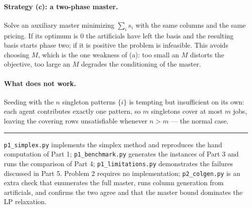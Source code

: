 \documentclass[11pt]{article}
\theoremstyle{definition}
\theoremstyle{plain}
\begin{document}
\paragraph{Strategy (c): a two-phase master.} Solve an auxiliary master
minimizing $\sum_i s_i$ with the same columns and the same pricing. If
its optimum is $0$ the artificials have left the basis and the resulting
basis starts phase two; if it is positive the problem is infeasible.
This avoids choosing $M$, which is the one weakness of (a): too small an
$M$ distorts the objective, too large an $M$ degrades the conditioning
of the master.

\paragraph{What does not work.} Seeding with the $n$ singleton patterns
$\{i\}$ is tempting but insufficient on its own: each agent contributes
exactly one pattern, so $m$ singletons cover at most $m$ jobs, leaving
the covering rows unsatisfiable whenever $n > m$ --- the normal case.

\vspace{1em}
\hrule
\vspace{0.6em}
{\small \sloppy \texttt{p1\_simplex.py} implements the simplex method and
reproduces the hand computation of Part 1; \texttt{p1\_benchmark.py}
generates the instances of Part 3 and runs the comparison of Part 4;
\texttt{p1\_limitations.py} demonstrates the failures discussed in Part
5. Problem 2 requires no implementation; \texttt{p2\_colgen.py} is an
extra check that enumerates the full master, runs column generation from
artificials, and confirms the two agree and that the master bound
dominates the LP relaxation.\par}
\end{document}
